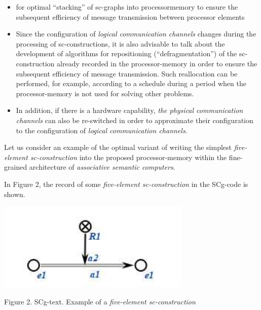 \documentclass{article}
\begin{document}
{\selectfont
\begin{multicols}{2}


\setcounter{page}{57}

\begin{itemize}
\item[] for optimal “stacking” of sc-graphs into processormemory to ensure the subsequent efficiency of
message transmission between processor elements


\item Since the configuration of \textit{logical communication
channels} changes during the processing of sc-constructions, it is also advisable to talk about
the development of algorithms for repositioning
(“defragmentation”) of the sc-construction already
recorded in the processor-memory in order to ensure
the subsequent efficiency of message transmission.
Such reallocation can be performed, for example,
according to a schedule during a period when the
processor-memory is not used for solving other
problems.

\item In addition, if there is a hardware capability, \textit{the physical communication channels} can also be re-switched
in order to approximate their configuration to the
configuration of \textit{logical communication channels}.
\end{itemize}

Let us consider an example of the optimal variant
of writing the simplest \textit{five-element sc-construction} into
the proposed processor-memory within the fine-grained
architecture of \textit{associative semantic computers}.

In Figure 2, the record of some \textit{five-element sc-construction} in the SCg-code is shown.

\begin{center}
    \includegraphics[scale=0.5]{images/aboa.png}
    
    \vspace{+6pt}
    {\small Figure 2. SCg-text. Example of a \textit{five-element sc-construction}}
\end{center}



\end{multicols}}
\end{document}
